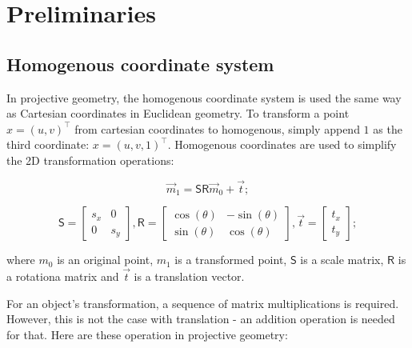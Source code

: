 \chapter{Preliminaries}

\label{chapter:preliminaries}
\section{Homogenous coordinate system}

In projective geometry, the homogenous coordinate system is used the same way as Cartesian coordinates in Euclidean geometry.
To transform a point $x=(u, v)^\top$ from cartesian coordinates to homogenous, simply append $1$ as the third coordinate: $x=(u, v, 1)^\top$.
Homogenous coordinates are used to simplify the 2D transformation operations: 


\begin{equation}
    \vec{m}_1 = 
    \pmb{\mathsf{S}} \pmb{\mathsf{R}}
    \vec{m}_0
    + \vec{t} ;
\end{equation}

\begin{equation}
    \pmb{\mathsf{S}} = \begin{bmatrix} s_x & 0 \\ 0 & s_y \end{bmatrix}, \pmb{\mathsf{R}} = \begin{bmatrix} \cos(\theta) & -\sin(\theta) \\ \sin(\theta) & \cos(\theta) \end{bmatrix}, \vec{t} = \begin{bmatrix} t_x \\ t_y \end{bmatrix} ;
\end{equation}

where $m_0$ is an original point,
$m_1$ is a transformed point,
$\pmb{\mathsf{S}}$ is a scale matrix,
$\pmb{\mathsf{R}}$ is a rotationa matrix and 
$\vec{t}$ is a translation vector.

For an object's transformation, a sequence of matrix multiplications is required. 
However, this is not the case with translation - an addition operation is needed for that. 
Here are these operation in projective geometry:

